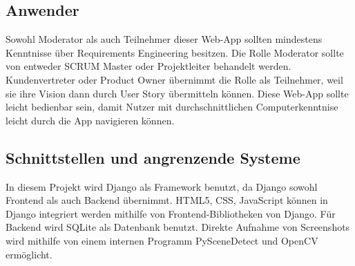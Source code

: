\subsection{Anwender}
Sowohl Moderator als auch Teilnehmer dieser Web-App sollten mindestens Kenntnisse über Requirements Engineering besitzen. Die Rolle Moderator sollte von entweder SCRUM Master 
oder Projektleiter behandelt werden. Kundenvertreter oder Product Owner übernimmt die Rolle als Teilnehmer, weil sie ihre Vision dann durch User Story übermitteln können. 
Diese Web-App sollte leicht bedienbar sein, damit Nutzer mit durchschnittlichen Computerkenntnise leicht durch die App navigieren können.

\subsection{Schnittstellen und angrenzende Systeme} 

In diesem Projekt wird Django als Framework benutzt, da Django sowohl Frontend als auch Backend übernimmt. HTML5, CSS, JavaScript können in Django integriert werden mithilfe 
von Frontend-Bibliotheken von Django. Für Backend wird SQLite als Datenbank benutzt. Direkte Aufnahme von Screenshots wird mithilfe von einem internen Programm PySceneDetect 
und OpenCV ermöglicht.
